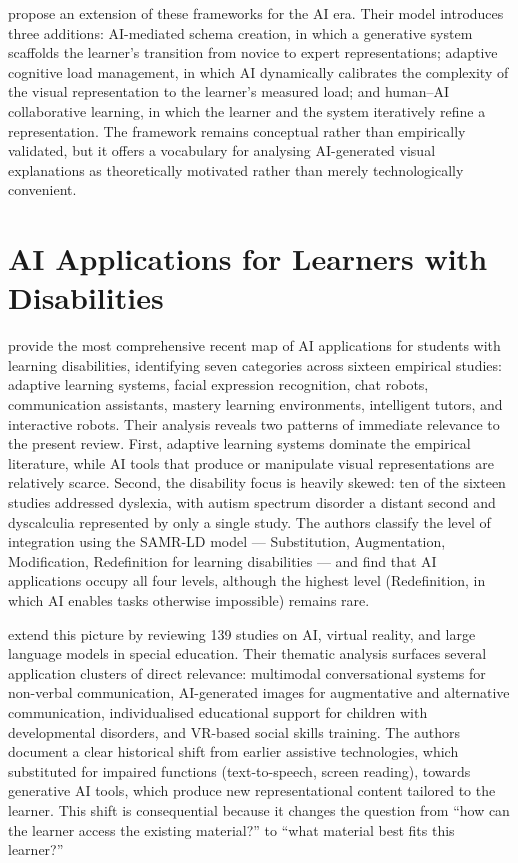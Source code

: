 \citet{twabu2025} propose an extension of these frameworks for the AI era. Their model introduces three additions: AI-mediated schema creation, in which a generative system scaffolds the learner's transition from novice to expert representations; adaptive cognitive load management, in which AI dynamically calibrates the complexity of the visual representation to the learner's measured load; and human--AI collaborative learning, in which the learner and the system iteratively refine a representation. The framework remains conceptual rather than empirically validated, but it offers a vocabulary for analysing AI-generated visual explanations as theoretically motivated rather than merely technologically convenient.

\section{AI Applications for Learners with Disabilities}

\citet{panjwani2024} provide the most comprehensive recent map of AI applications for students with learning disabilities, identifying seven categories across sixteen empirical studies: adaptive learning systems, facial expression recognition, chat robots, communication assistants, mastery learning environments, intelligent tutors, and interactive robots. Their analysis reveals two patterns of immediate relevance to the present review. First, adaptive learning systems dominate the empirical literature, while AI tools that produce or manipulate visual representations are relatively scarce. Second, the disability focus is heavily skewed: ten of the sixteen studies addressed dyslexia, with autism spectrum disorder a distant second and dyscalculia represented by only a single study. The authors classify the level of integration using the SAMR-LD model --- Substitution, Augmentation, Modification, Redefinition for learning disabilities --- and find that AI applications occupy all four levels, although the highest level (Redefinition, in which AI enables tasks otherwise impossible) remains rare.

\citet{drosos2025} extend this picture by reviewing 139 studies on AI, virtual reality, and large language models in special education. Their thematic analysis surfaces several application clusters of direct relevance: multimodal conversational systems for non-verbal communication, AI-generated images for augmentative and alternative communication, individualised educational support for children with developmental disorders, and VR-based social skills training. The authors document a clear historical shift from earlier assistive technologies, which substituted for impaired functions (text-to-speech, screen reading), towards generative AI tools, which produce new representational content tailored to the learner. This shift is consequential because it changes the question from ``how can the learner access the existing material?'' to ``what material best fits this learner?''

